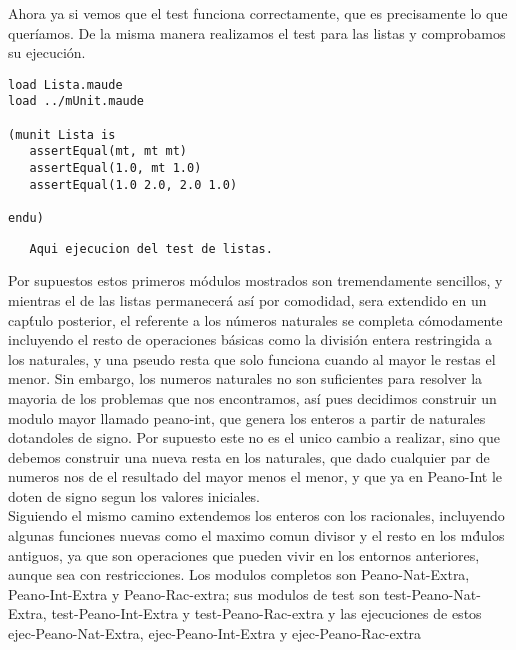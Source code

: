 Ahora ya si vemos que el test funciona correctamente, que es precisamente lo que quer\'iamos. De la misma manera realizamos el test para las listas y comprobamos su ejecuci\'on. \par

\begin{verbatim}
load Lista.maude
load ../mUnit.maude

(munit Lista is
   assertEqual(mt, mt mt)
   assertEqual(1.0, mt 1.0)
   assertEqual(1.0 2.0, 2.0 1.0)

endu)

\end{verbatim}

\begin{verbatim}
   Aqui ejecucion del test de listas.
\end{verbatim}

Por supuestos estos primeros m\'odulos mostrados son tremendamente sencillos, y mientras el de las listas permanecer\'a as\'i por comodidad, sera extendido en un cap\'tulo posterior, el referente a los n\'umeros naturales se completa c\'omodamente incluyendo el resto de operaciones b\'asicas como la divisi\'on entera restringida a los naturales, y una pseudo resta que solo funciona cuando al mayor le restas el menor. Sin embargo, los numeros naturales no son suficientes para resolver la mayoria de los problemas que nos encontramos, as\'i pues decidimos construir un modulo mayor llamado peano-int, que genera los enteros a partir de naturales dotandoles de signo. Por supuesto este no es el unico cambio a realizar, sino que debemos construir una nueva resta en los naturales, que dado cualquier par de numeros nos de el resultado del mayor menos el menor, y que ya en Peano-Int le doten de signo segun los valores iniciales. \\

Siguiendo el mismo camino extendemos los enteros con los racionales, incluyendo algunas funciones nuevas como el maximo comun divisor y el resto en los m\'dulos antiguos, ya que son operaciones que pueden vivir en los entornos anteriores, aunque sea con restricciones. Los modulos completos son Peano-Nat-Extra, Peano-Int-Extra y Peano-Rac-extra; sus modulos de test son test-Peano-Nat-Extra, test-Peano-Int-Extra y test-Peano-Rac-extra y las ejecuciones de estos ejec-Peano-Nat-Extra, ejec-Peano-Int-Extra y ejec-Peano-Rac-extra \par


